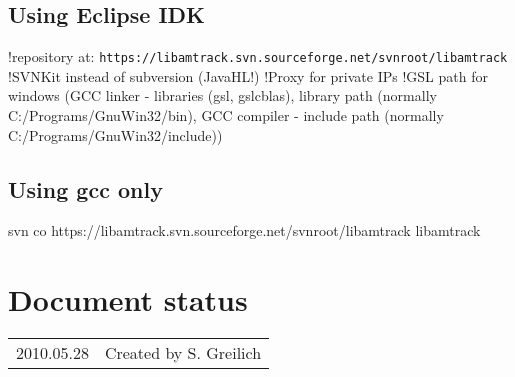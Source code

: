 \subsection{Using Eclipse IDK}
!repository at: \texttt{https://libamtrack.svn.sourceforge.net/svnroot/libamtrack}
!SVNKit instead of subversion (JavaHL!)
!Proxy for private IPs
!GSL path for windows (GCC linker - libraries (gsl, gslcblas), library path (normally C:/Programs/GnuWin32/bin), GCC compiler - include path (normally C:/Programs/GnuWin32/include))
\subsection{Using gcc only}
svn co https://libamtrack.svn.sourceforge.net/svnroot/libamtrack libamtrack 


\section*{Document status}
\begin{tabular}{l l}
2010.05.28&Created by S. Greilich
\end{tabular}